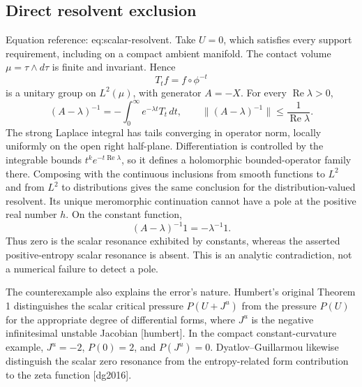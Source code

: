 \documentclass[10pt]{article}
\begin{document}
\subsection*{Direct resolvent exclusion}
Equation reference: eq:scalar-resolvent. Take \(U=0\), which satisfies every support requirement, including on a compact ambient manifold. The contact volume \(\mu=\tau\wedge d\tau\) is finite and invariant. Hence \[T_t f=f\circ\phi^{-t}\] is a unitary group on \(L^2(\mu)\), with generator \(A=-X\). For every \(\operatorname{Re}\lambda>0\), \[
 (A-\lambda)^{-1}
 =-\int_0^\infty e^{-\lambda t}T_t\,dt,\qquad
 \|(A-\lambda)^{-1}\|\leq\frac{1}{\operatorname{Re}\lambda}.\] The strong Laplace integral has tails converging in operator norm, locally uniformly on the open right half-plane. Differentiation is controlled by the integrable bounds \(t^k e^{-t\operatorname{Re}\lambda}\), so it defines a holomorphic bounded-operator family there. Composing with the continuous inclusions from smooth functions to \(L^2\) and from \(L^2\) to distributions gives the same conclusion for the distribution-valued resolvent. Its unique meromorphic continuation cannot have a pole at the positive real number \(h\). On the constant function, \[(A-\lambda)^{-1}1=-\lambda^{-1}1.\] Thus zero is the scalar resonance exhibited by constants, whereas the asserted positive-entropy scalar resonance is absent. This is an analytic contradiction, not a numerical failure to detect a pole.\par
The counterexample also explains the error’s nature. Humbert’s original Theorem 1 distinguishes the scalar critical pressure \(P(U+J^u)\) from the pressure \(P(U)\) for the appropriate degree of differential forms, where \(J^u\) is the negative infinitesimal unstable Jacobian [humbert]. In the compact constant-curvature example, \(J^u=-2\), \(P(0)=2\), and \(P(J^u)=0\). Dyatlov–Guillarmou likewise distinguish the scalar zero resonance from the entropy-related form contribution to the zeta function [dg2016].\par
\end{document}
